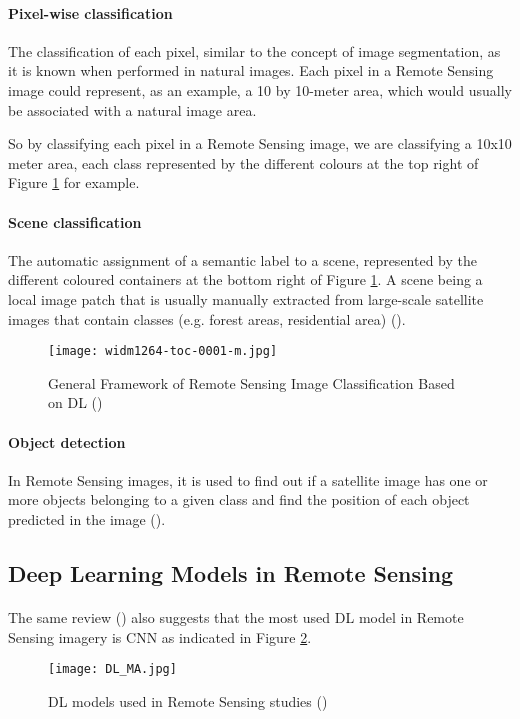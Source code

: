 \paragraph{Pixel-wise classification} The classification of each pixel, similar to the concept of image segmentation, as it is known when performed in natural images. Each pixel in a Remote Sensing image could represent, as an example, a 10 by 10-meter area, which would usually be associated with a natural image area. 

So by classifying each pixel in a Remote Sensing image, we are classifying a 10x10 meter area, each class represented by the different colours at the top right of Figure \ref{fig_img_class_frame} for example. 

\paragraph{Scene classification} The automatic assignment of a semantic label to a scene, represented by the different coloured containers at the bottom right of Figure \ref{fig_img_class_frame}. A scene being a local image patch that is usually manually extracted from large-scale satellite images that contain classes (e.g. forest areas, residential area) (\cite{https://doi.org/10.1002/widm.1264}).

    \begin{figure}[hbt!]
        \centering
        \texttt{[image: widm1264-toc-0001-m.jpg]}
        \caption{General Framework of Remote Sensing Image Classification Based on DL (\cite{https://doi.org/10.1002/widm.1264})}
        \label{fig_img_class_frame}
    \end{figure}


\paragraph{Object detection} In Remote Sensing images, it is used to find out if a satellite image has one or more objects belonging to a given class and find the position of each object predicted in the image (\cite{CHENG201611}).

\subsection{Deep Learning Models in Remote Sensing} \label{dl_models_rs}
\paragraph{}
The same review (\cite{MA2019166}) also suggests that the most used \gls{DL} model in Remote Sensing imagery is \gls{CNN} as indicated in Figure \ref{fig_dl_rs}.
    \begin{figure}[hbt!]
        \centering
        \texttt{[image: DL\_MA.jpg]}
        \caption{DL models used in Remote Sensing studies (\cite{MA2019166})}
        \label{fig_dl_rs}
    \end{figure}
    

